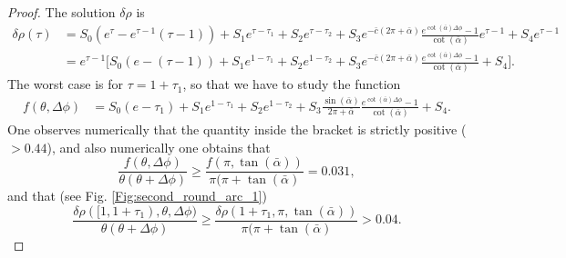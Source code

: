 \documentclass[reqno]{amsart}
\theoremstyle{definition} \newtheorem{definition}{Definition}[section]
\theoremstyle{definition} \newtheorem{remark}[definition]{Remark}
\theoremstyle{plain} \newtheorem{lemma}[definition]{Lemma}
\theoremstyle{plain} \newtheorem{proposition}[definition]{Proposition}
\theoremstyle{plain} \newtheorem{theorem}[definition]{Theorem}
\theoremstyle{plain} \newtheorem{corollary}[definition]{Corollary}
\theoremstyle{definition} \newtheorem{example}[definition]{Example}
\theoremstyle{plain} \newtheorem{claim}[clai]{Claim}
\theoremstyle{definition} \newtheorem{assumption}[definition]{Assumption}
\theoremstyle{definition} \newtheorem{observation}[definition]{Observation}
\newcommand{\1}{\mathbbm 1}
\numberwithin{equation}{section} %
\theoremstyle{plain} \newtheorem*{theorem*}{Theorem}
\theoremstyle{plain} \newtheorem{mthm}[maintheorem]{Main Theorem}
\theoremstyle{plain} \newtheorem*{mthm*}{Main Theorem}
\theoremstyle{plain} \newtheorem*{conjecture*}{Conjecture}
\theoremstyle{plain} \newtheorem{conjecture}[definition]{Conjecture}
\theoremstyle{plain} \newtheorem*{problem*}{Problem}
\begin{document}
\begin{proof}
\noindent The solution $\delta \rho$ is
\begin{align*}
\delta \rho(\tau) &= S_0 (e^{\tau} - e^{\tau - 1} (\tau - 1)) + S_1 e^{\tau - \tau_1} + S_2 e^{\tau - \tau_2} + S_3 e^{- \bar c (2\pi + \bar \alpha)} \frac{e^{\cot(\bar \alpha) \Delta \phi} - 1}{\cot(\bar \alpha)} e^{\tau - 1} + S_4 e^{\tau - 1} \\
&= e^{\tau - 1} \bigg[ S_0 (e - (\tau - 1)) + S_1 e^{1 - \tau_1} + S_2 e^{1 - \tau_2} + S_3 e^{-\bar c(2\pi + \bar \alpha)} \frac{e^{\cot(\bar \alpha) \Delta \phi} - 1}{\cot(\bar \alpha)} + S_4 \bigg].
\end{align*}
The worst case is for $\tau = 1 + \tau_1$, so that we have to study the function
\begin{align*}
f(\theta,\Delta \phi) &= S_0 (e - \tau_1) + S_1 e^{1 - \tau_1} + S_2 e^{1 - \tau_2} + S_3 \frac{\sin(\bar \alpha)}{2\pi + \bar \alpha} \frac{e^{\cot(\bar \alpha) \Delta \phi} - 1}{\cot(\bar \alpha)} + S_4.
\end{align*}
One observes numerically that the quantity inside the bracket is strictly positive ($> 0.44$), and also numerically one obtains that
\begin{equation*}
\frac{f(\theta,\Delta \phi)}{\theta(\theta + \Delta \phi)} \geq \frac{f(\pi,\tan(\bar \alpha))}{\pi(\pi + \tan(\bar \alpha)} = 0.031,
\end{equation*}
and that (see Fig. \ref{Fig:second_round_arc_1})
\begin{equation*}
\frac{\delta \rho([1,1+\tau_1),\theta,\Delta \phi)}{\theta(\theta + \Delta \phi)} \geq \frac{\delta \rho(1+\tau_1,\pi,\tan(\bar \alpha))}{\pi(\pi+\tan(\bar \alpha)} > 0.04.
\end{equation*}


\end{proof}
\end{document}
